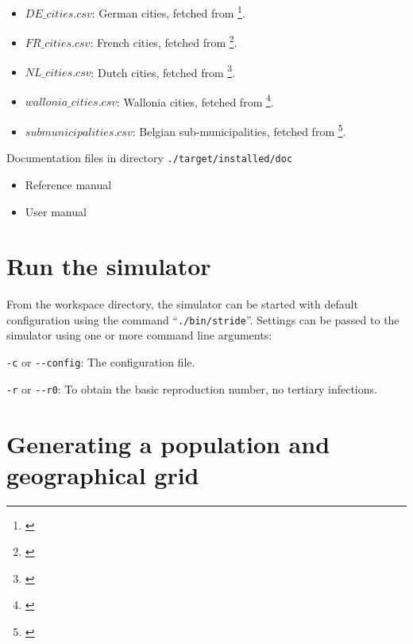 \begin{compactitem}
\begin{itemize}
        \item $DE\_cities.csv$: German cities, fetched from \footnote{\url{}}.
        \item $FR\_cities.csv$: French cities, fetched from \footnote{\url{}}.
        \item $NL\_cities.csv$: Dutch cities, fetched from \footnote{\url{}}.
        \item $wallonia\_cities.csv$: Wallonia cities, fetched from \footnote{\url{}}.
        \item $submunicipalities.csv$: Belgian sub-municipalities, fetched from \footnote{\url{}}.
        \end{itemize}
    \item Documentation files
      	in directory \texttt{./target/installed/doc}
      	\begin{itemize}
        		\item Reference manual
        		\item User manual
        \end{itemize}
\end{compactitem}



\section{Run the simulator}


From the workspace directory, the simulator can be started with default configuration using the command \mbox{``\texttt{./bin/stride}''}. Settings can be passed to the simulator using one or more command line arguments:

\begin{compactitem}

\item \texttt{-c} or \texttt{{-}-config}: The configuration file.

\item \texttt{-r} or \texttt{{-}-r0}: To obtain the basic reproduction number, no tertiary infections.

\end{compactitem}

\section{Generating a population and geographical grid}


